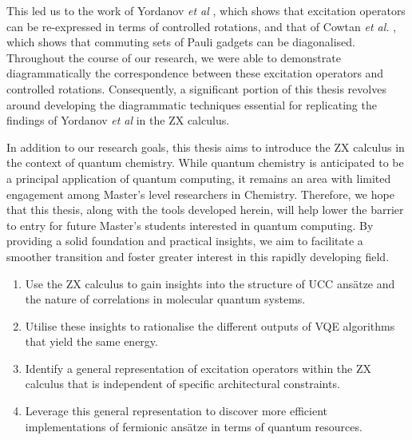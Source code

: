 This led us to the work of Yordanov \textit{et al} \cite{Yordanov2020}, which shows that excitation operators can be re-expressed in terms of controlled rotations, and that of Cowtan \textit{et al.} \cite{Cowtan2020}, which shows that commuting sets of Pauli gadgets can be diagonalised. Throughout the course of our research, we were able to demonstrate diagrammatically the correspondence between these excitation operators and controlled rotations. Consequently, a significant portion of this thesis revolves around developing the diagrammatic techniques essential for replicating the findings of Yordanov \textit{et al} in the ZX calculus.

In addition to our research goals, this thesis aims to introduce the ZX calculus in the context of quantum chemistry. While quantum chemistry is anticipated to be a principal application of quantum computing, it remains an area with limited engagement among Master's level researchers in Chemistry. Therefore, we hope that this thesis, along with the tools developed herein, will help lower the barrier to entry for future Master's students interested in quantum computing. By providing a solid foundation and practical insights, we aim to facilitate a smoother transition and foster greater interest in this rapidly developing field.

\begin{enumerate}[itemsep=-5pt]
\item Use the ZX calculus to gain insights into the structure of UCC ansätze and the nature of correlations in molecular quantum systems.
\item Utilise these insights to rationalise the different outputs of VQE algorithms that yield the same energy.
\item Identify a general representation of excitation operators within the ZX calculus that is independent of specific architectural constraints.
\item Leverage this general representation to discover more efficient implementations of fermionic ansätze in terms of quantum resources.
\end{enumerate}
